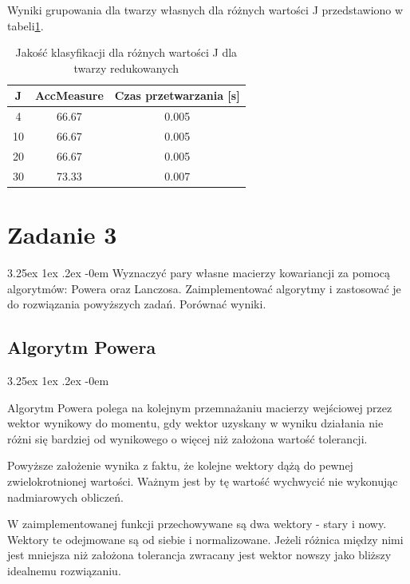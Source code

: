 \documentclass[11pt, a4paper]{article}
\makeatletter
\newcommand{\fbi}{\leavevmode{\parindent=1em\indent}}
\renewcommand\paragraph{\@startsection{paragraph}{5}{\z@}
  {3.25ex \@plus1ex \@minus.2ex}
  {-0em}
  {\normalfont\normalsize\bfseries}}
\makeatother
\begin{document}
\fbi
Wyniki grupowania dla twarzy własnych dla różnych wartości J przedstawiono w tabeli\ref{tab:wynikiKlasyfikacjaRedukowane}.

\begin{table}[H]
	\centering
	\caption{Jakość klasyfikacji dla różnych wartości J dla twarzy redukowanych}
	\begin{tabular}{|c|c|c|}
		\hline 
		J & AccMeasure & Czas przetwarzania [s] \\ 
		\hline
		4 & 66.67 & 0.005 \\
		\hline
		10 & 66.67 & 0.005 \\
		\hline
		20 & 66.67 & 0.005 \\
		\hline
		30 & 73.33 & 0.007 \\
		\hline
	\end{tabular}
	\label{tab:wynikiKlasyfikacjaRedukowane}
\end{table}


\section{Zadanie 3}
\paragraph{}
Wyznaczyć pary własne macierzy kowariancji za pomocą algorytmów: Powera oraz Lanczosa. Zaimplementować algorytmy i zastosować je do rozwiązania powyższych zadań. Porównać wyniki.

\subsection{Algorytm Powera}
\paragraph{}



\fbi
Algorytm Powera polega na kolejnym przemnażaniu macierzy wejściowej przez wektor wynikowy do momentu, gdy wektor uzyskany w wyniku działania nie różni się bardziej od wynikowego o więcej niż założona wartość tolerancji.

\fbi
Powyższe założenie wynika z faktu, że kolejne wektory dążą do pewnej zwielokrotnionej wartości. Ważnym jest by tę wartość wychwycić nie wykonując nadmiarowych obliczeń.

\fbi
W zaimplementowanej funkcji przechowywane są dwa wektory - stary i nowy. Wektory te odejmowane są od siebie i normalizowane. Jeżeli różnica między nimi jest mniejsza niż założona tolerancja zwracany jest wektor nowszy jako bliższy idealnemu rozwiązaniu.
\end{document}
